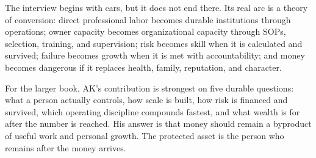 The interview begins with cars, but it does not end there. Its real arc is a theory of conversion: direct professional labor becomes durable institutions through operations; owner capacity becomes organizational capacity through SOPs, selection, training, and supervision; risk becomes skill when it is calculated and survived; failure becomes growth when it is met with accountability; and money becomes dangerous if it replaces health, family, reputation, and character.

For the larger book, AK's contribution is strongest on five durable questions: what a person actually controls, how scale is built, how risk is financed and survived, which operating discipline compounds fastest, and what wealth is for after the number is reached. His answer is that money should remain a byproduct of useful work and personal growth. The protected asset is the person who remains after the money arrives.